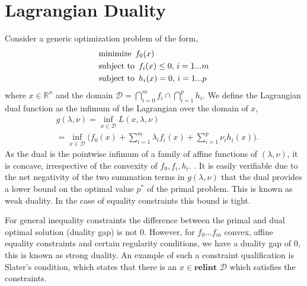 \documentclass[letterpaper]{article} %
\begin{document}
\section{Lagrangian Duality}
Consider a generic optimization problem of the form,
\begin{equation}
\begin{aligned}
&\text{minimize } \thinspace f_{0}(x)\\
&\text{subject to } \thinspace f_{i}(x) \leq 0, \thinspace i=1...m\\
&\text{subject to } \thinspace h_{i}(x) = 0, \thinspace i=1...p
\end{aligned}
\end{equation}
where $x \in \mathbb{R}^{n}$ and the domain $\mathcal{D} = \bigcap\limits_{i=0}^{m} f_{i}\cap\bigcap\limits_{i=1}^{p}h_{i}$. We define the Lagrangian dual function as the infimum of the Lagrangian over the domain of $x$,
\begin{equation}
\begin{aligned}
& g(\lambda,\nu) = \underset{x \in \mathcal{D}}{\inf}L(x,\lambda, \nu)\\
& = \underset{x \in \mathcal{D}}{\inf}\biggl( f_{0}(x) + \sum_{i=1}^{m}\lambda_{i}f_{i}(x) + \sum_{i=1}^{p}\nu_{i}h_{i}(x)\biggr).
\end{aligned}
\end{equation}
As the dual is the pointwise infimum of a family of affine functions of $(\lambda, \nu)$, it is concave, irrespective of the convexity of $f_{0},f_{i},h_{i}$. \cite{boyd_vandenberghe_2009}. It is easily verifiable due to the net negativity of the two summation terms in $g(\lambda, \nu)$ that the dual provides a lower bound on the optimal value $p^{*}$ of the primal problem. This is known as weak duality. In the case of equality constraints this bound is tight. 

For general inequality constraints the difference between the primal and dual optimal solution (duality gap) is not 0. However, for $f_{0}...f_{m}$ convex, affine equality constraints and certain regularity conditions, we have a duality gap of $0$, this is known as strong duality. An example of such a constraint qualification is Slater's condition, which states that there is an $x \in \textbf{relint } \mathcal{D}$ which satisfies the constraints.
\end{document}
